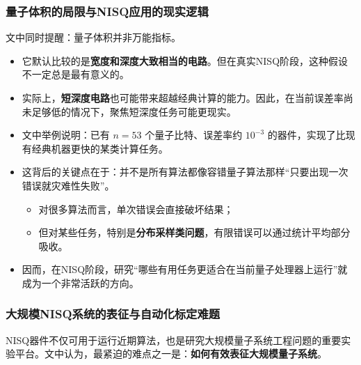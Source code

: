 \documentclass[12pt,a4paper,oneside]{ctexbook}
\begin{document}
\subsubsection{量子体积的局限与NISQ应用的现实逻辑}

文中同时提醒：量子体积并非万能指标。

\begin{itemize}
    \item 它默认比较的是\textbf{宽度和深度大致相当的电路}。但在真实NISQ阶段，这种假设不一定总是最有意义的。
    
    \item 实际上，\textbf{短深度电路}也可能带来超越经典计算的能力。因此，在当前误差率尚未足够低的情况下，聚焦短深度任务可能更现实。
    
    \item 文中举例说明：已有 \(n=53\) 个量子比特、误差率约 \(10^{-3}\) 的器件，实现了比现有经典机器更快的某类计算任务。
    
    \item 这背后的关键点在于：并不是所有算法都像容错量子算法那样“只要出现一次错误就灾难性失败”。
    \begin{itemize}
        \item 对很多算法而言，单次错误会直接破坏结果；
        \item 但对某些任务，特别是\textbf{分布采样类问题}，有限错误可以通过统计平均部分吸收。
    \end{itemize}
    
    \item 因而，在NISQ阶段，研究“哪些有用任务更适合在当前量子处理器上运行”就成为一个非常活跃的方向。
\end{itemize}

\subsubsection{大规模NISQ系统的表征与自动化标定难题}

NISQ器件不仅可用于运行近期算法，也是研究大规模量子系统工程问题的重要实验平台。文中认为，最紧迫的难点之一是：\textbf{如何有效表征大规模量子系统}。
\end{document}
